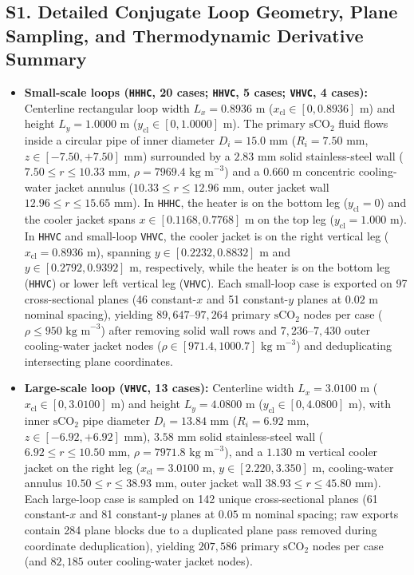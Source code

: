 \documentclass[10pt]{article}
\begin{document}
\subsection*{S1. Detailed Conjugate Loop Geometry, Plane Sampling, and Thermodynamic Derivative Summary}
\begin{itemize}
\item \textbf{Small-scale loops (\texttt{HHHC}, 20 cases; \texttt{HHVC}, 5 cases; \texttt{VHVC}, 4 cases):} Centerline rectangular loop width $L_x = 0.8936\text{ m}$ ($x_{\mathrm{cl}} \in [0, 0.8936]\text{ m}$) and height $L_y = 1.0000\text{ m}$ ($y_{\mathrm{cl}} \in [0, 1.0000]\text{ m}$). The primary $\mathrm{sCO}_2$ fluid flows inside a circular pipe of inner diameter $D_i = 15.0\text{ mm}$ ($R_i = 7.50\text{ mm}$, $z \in [-7.50, +7.50]\text{ mm}$) surrounded by a $2.83\text{ mm}$ solid stainless-steel wall ($7.50 \le r \le 10.33\text{ mm}$, $\rho = 7969.4\text{ kg m}^{-3}$) and a $0.660\text{ m}$ concentric cooling-water jacket annulus ($10.33 \le r \le 12.96\text{ mm}$, outer jacket wall $12.96 \le r \le 15.65\text{ mm}$). In \texttt{HHHC}, the heater is on the bottom leg ($y_{\mathrm{cl}}=0$) and the cooler jacket spans $x \in [0.1168, 0.7768]\text{ m}$ on the top leg ($y_{\mathrm{cl}}=1.000\text{ m}$). In \texttt{HHVC} and small-loop \texttt{VHVC}, the cooler jacket is on the right vertical leg ($x_{\mathrm{cl}}=0.8936\text{ m}$), spanning $y \in [0.2232, 0.8832]\text{ m}$ and $y \in [0.2792, 0.9392]\text{ m}$, respectively, while the heater is on the bottom leg (\texttt{HHVC}) or lower left vertical leg (\texttt{VHVC}). Each small-loop case is exported on 97 cross-sectional planes (46 constant-$x$ and 51 constant-$y$ planes at $0.02\text{ m}$ nominal spacing), yielding $89,647\text{--}97,264$ primary $\mathrm{sCO}_2$ nodes per case ($\rho \le 950\text{ kg m}^{-3}$) after removing solid wall rows and $7,236\text{--}7,430$ outer cooling-water jacket nodes ($\rho \in [971.4, 1000.7]\text{ kg m}^{-3}$) and deduplicating intersecting plane coordinates.
\item \textbf{Large-scale loop (\texttt{VHVC}, 13 cases):} Centerline width $L_x = 3.0100\text{ m}$ ($x_{\mathrm{cl}} \in [0, 3.0100]\text{ m}$) and height $L_y = 4.0800\text{ m}$ ($y_{\mathrm{cl}} \in [0, 4.0800]\text{ m}$), with inner $\mathrm{sCO}_2$ pipe diameter $D_i = 13.84\text{ mm}$ ($R_i = 6.92\text{ mm}$, $z \in [-6.92, +6.92]\text{ mm}$), $3.58\text{ mm}$ solid stainless-steel wall ($6.92 \le r \le 10.50\text{ mm}$, $\rho = 7971.8\text{ kg m}^{-3}$), and a $1.130\text{ m}$ vertical cooler jacket on the right leg ($x_{\mathrm{cl}}=3.0100\text{ m}$, $y \in [2.220, 3.350]\text{ m}$, cooling-water annulus $10.50 \le r \le 38.93\text{ mm}$, outer jacket wall $38.93 \le r \le 45.80\text{ mm}$). Each large-loop case is sampled on 142 unique cross-sectional planes (61 constant-$x$ and 81 constant-$y$ planes at $0.05\text{ m}$ nominal spacing; raw exports contain 284 plane blocks due to a duplicated plane pass removed during coordinate deduplication), yielding $207,586$ primary $\mathrm{sCO}_2$ nodes per case (and $82,185$ outer cooling-water jacket nodes).
\end{itemize}
\end{document}
